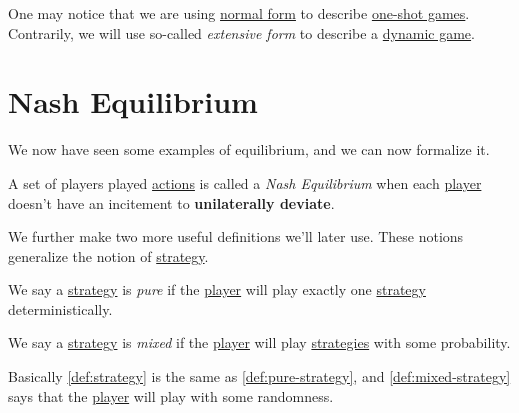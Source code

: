 \begin{note}
	One may notice that we are using \href{https://en.wikipedia.org/wiki/Normal-form_game}{normal form} to describe \hyperref[def:one-shot-game]{one-shot games}. Contrarily, we will use so-called \emph{extensive form} to describe a \hyperref[def:dynamic-game]{dynamic game}.
\end{note}

\section{Nash Equilibrium}
We now have seen some examples of equilibrium, and we can now formalize it.
\begin{definition}\label{def:Nash-equilibrium}
	A set of players played \hyperref[def:strategy]{actions} is called a \emph{Nash Equilibrium} when each \hyperref[def:player]{player} doesn't have an incitement to \textbf{unilaterally deviate}.
\end{definition}

We further make two more useful definitions we'll later use. These notions generalize the notion of \hyperref[def:strategy]{strategy}.

\begin{definition}\label{def:pure-strategy}
	We say a \hyperref[def:strategy]{strategy} is \emph{pure} if the \hyperref[def:player]{player} will play exactly one \hyperref[def:strategy]{strategy} deterministically.
\end{definition}

\begin{definition}\label{def:mixed-strategy}
	We say a \hyperref[def:strategy]{strategy} is \emph{mixed} if the \hyperref[def:player]{player} will play \hyperref[def:strategy]{strategies} with some probability.
\end{definition}
\begin{intuition}
	Basically \autoref{def:strategy} is the same as \autoref{def:pure-strategy}, and \autoref{def:mixed-strategy} says that the \hyperref[def:player]{player} will play with some randomness.
\end{intuition}

